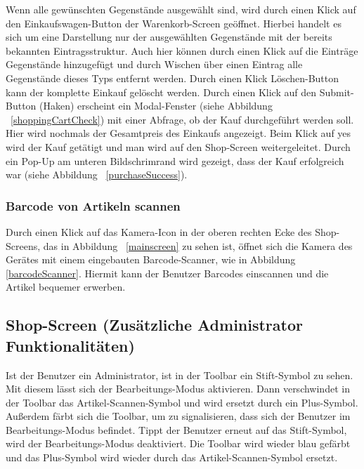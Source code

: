 Wenn alle gewünschten Gegenstände ausgewählt sind, wird durch einen Klick auf den Einkaufswagen-Button der Warenkorb-Screen geöffnet.
Hierbei handelt es sich um eine Darstellung nur der ausgewählten Gegenstände mit der bereits bekannten Eintragsstruktur.
Auch hier können durch einen Klick auf die Einträge Gegenstände hinzugefügt und durch Wischen über einen Eintrag alle Gegenstände dieses Typs entfernt werden.
Durch einen Klick Löschen-Button kann der komplette Einkauf gelöscht werden.
Durch einen Klick auf den Submit-Button (Haken) erscheint ein Modal-Fenster (siehe Abbildung ~\ref{shoppingCartCheck}) mit einer Abfrage, ob der Kauf durchgeführt werden soll.
Hier wird nochmals der Gesamtpreis des Einkaufs angezeigt.
Beim Klick auf \glqq yes\grqq{} wird der Kauf getätigt und man wird auf den Shop-Screen weitergeleitet.
Durch ein Pop-Up am unteren Bildschrimrand wird gezeigt, dass der Kauf erfolgreich war (siehe Abbildung ~\ref{purchaseSuccess}).


\subsubsection{Barcode von Artikeln scannen} \label{subsubsec:shop-scan-item}

Durch einen Klick auf das Kamera-Icon in der oberen rechten Ecke des Shop-Screens, das in Abbildung ~\ref{mainscreen} zu sehen ist, öffnet sich die Kamera des Gerätes mit einem eingebauten Barcode-Scanner, wie in Abbildung \ref{barcodeScanner}. Hiermit kann der Benutzer Barcodes einscannen und die Artikel bequemer erwerben.


\subsection{Shop-Screen (Zusätzliche Administrator Funktionalitäten)} \label{subsec:shop-screen-admin}

Ist der Benutzer ein Administrator, ist in der Toolbar ein Stift-Symbol zu sehen.
Mit diesem lässt sich der Bearbeitungs-Modus aktivieren.
Dann verschwindet in der Toolbar das Artikel-Scannen-Symbol und wird ersetzt durch ein Plus-Symbol.
Außerdem färbt sich die Toolbar, um zu signalisieren, dass sich der Benutzer im Bearbeitungs-Modus befindet.
Tippt der Benutzer erneut auf das Stift-Symbol, wird der Bearbeitungs-Modus deaktiviert.
Die Toolbar wird wieder blau gefärbt und das Plus-Symbol wird wieder durch das Artikel-Scannen-Symbol ersetzt.

